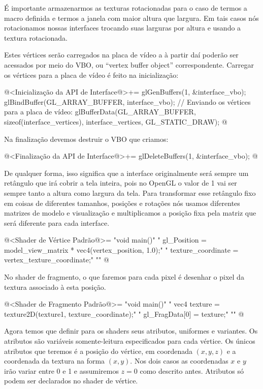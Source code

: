 É importante armazenarmos as texturas rotacionadas para o caso de
termos a macro  definida e termos a
janela com maior altura que largura. Em tais casos nós rotacionamos
nossas interfaces trocando suas larguras por altura e usando a textura
rotacionada.

Estes vértices serão carregados na placa de vídeo a à partir daí
poderão ser acessados por meio do VBO, ou ``vertex buffer object''
correspondente. Carregar os vértices para a placa de vídeo é feito na
inicialização:

\iniciocodigo
@<Inicialização da API de Interface@>+=
glGenBuffers(1, &interface_vbo);
glBindBuffer(GL_ARRAY_BUFFER, interface_vbo);
// Enviando os vértices para a placa de vídeo:
glBufferData(GL_ARRAY_BUFFER, sizeof(interface_vertices), interface_vertices,
             GL_STATIC_DRAW);
@
\fimcodigo

Na finalização devemos destruir o VBO que criamos:

\iniciocodigo
@<Finalização da API de Interface@>+=
glDeleteBuffers(1, &interface_vbo);
@
\fimcodigo

De qualquer forma, isso significa que a interface originalmente será
sempre um retângulo que irá cobrir a tela inteira, pois no OpenGL o
valor de 1 vai ser sempre tanto a altura como largura da tela.  Para
transformar esse retângulo fixo em coisas de diferentes tamanhos,
posições e rotações nós usamos diferentes matrizes de modelo e
visualização e multiplicamos a posição fixa pela matriz que será
diferente para cada interface.

\iniciocodigo
@<Shader de Vértice Padrão@>=
"void main(){\n"
"  gl_Position = model_view_matrix * vec4(vertex_position, 1.0);\n"
"  texture_coordinate = vertex_texture_coordinate;\n"
"}\n"
@
\fimcodigo

No shader de fragmento, o que faremos para cada pixel é desenhar o
pixel da textura associado à esta posição.

\iniciocodigo
@<Shader de Fragmento Padrão@>=
"void main(){\n"
"  vec4 texture = texture2D(texture1, texture_coordinate);\n"
"  gl_FragData[0] = texture;\n"
"}\n"
@
\fimcodigo

Agora temos que definir para os shaders seus atributos, uniformes e
variantes. Os atributos são variáveis somente-leitura especificados
para cada vértice. Os únicos atributos que teremos é a posição do
vértice, em coordenada $(x, y, z)$ e a coordenada da textura na forma
$(x, y)$. Nos dois casos as coordenadas $x$ e $y$ irão variar entre 0
e 1 e assumiremos $z=0$ como descrito antes. Atributos só podem ser
declarados no shader de vértice.

